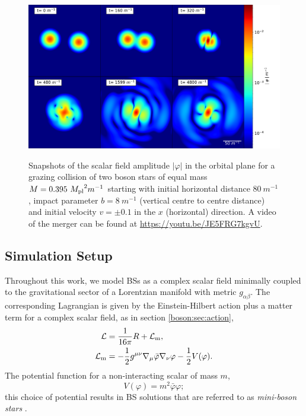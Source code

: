 \begin{figure}[h!]
\begin{center}{
    {\includegraphics[width=1.0\columnwidth]{ag_fig/modphi_plot_axes_log.png}}
\caption{
    Snapshots of the scalar field amplitude $|\varphi|$
    in the orbital plane for a
    grazing collision of two boson stars
    of equal mass $M=0.395~{M_{\rm pl}}^2 m^{-1}$ starting with initial horizontal distance $80~m^{-1}$, impact
    parameter $b=8~m^{-1}$ (vertical centre to centre distance) and initial velocity $v=\pm 0.1$
    in the $x$ (horizontal) direction. A video of the merger can be found at \url{https://youtu.be/JE5FRG7kgvU}.}
\label{ag:fig:Panellog}}
\end{center}
\end{figure}




\subsection{Simulation Setup}\label{ag:section:inital_data}

Throughout this work, we model BSs as a complex scalar field
minimally coupled to the gravitational sector of a Lorentzian
manifold with metric $g_{\alpha\beta}$. The corresponding
Lagrangian is given by the Einstein-Hilbert action plus a
matter term for a complex scalar field, as in section \ref{boson:sec:action},
%
\begin{align}
  \mathcal{L} &= \frac{1}{16\pi}R + \mathcal{L}_{\rm m}, \\
  \mathcal{L}_{\rm m} &=-\frac{1}{2}g^{\mu\nu}\nabla_{\mu}{\bar{\varphi}}\nabla_{\nu}{\varphi}-\frac{1}{2} V(\varphi).
\end{align}
 The potential function for a non-interacting scalar of mass $m$,
\begin{equation}
    V(\varphi) = m^2 \bar{\varphi} \varphi;
\end{equation}
 this choice of potential results in BS solutions that are referred to as {\it mini-boson stars}
\cite{ Kaup:1968zz,Gleiser:1988rq,Jetzer:1988vr}.




